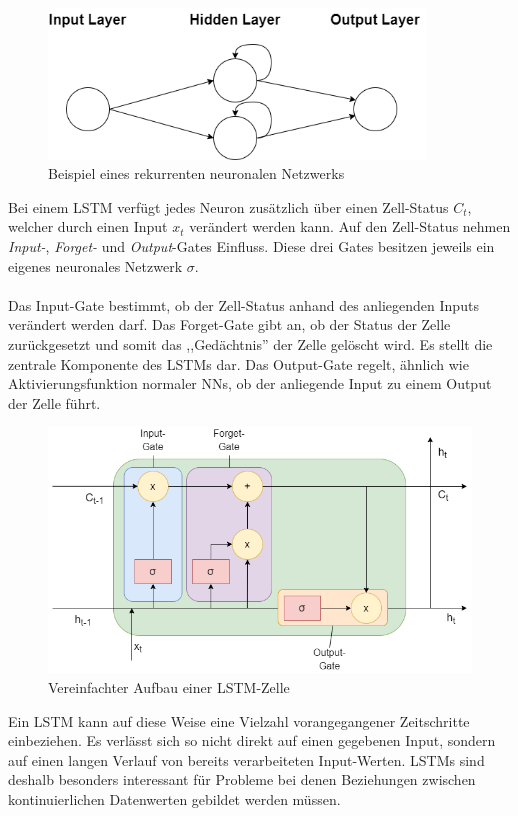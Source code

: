 \begin{figure}[h]
    \centering
    \includegraphics[width=10.0cm]{pic/RecurrentNN.png}
    \caption{Beispiel eines rekurrenten neuronalen Netzwerks}
    \label{fig:RecNN}
\end{figure}
\newpage
Bei einem LSTM verfügt jedes Neuron zusätzlich über einen Zell-Status $C_t$, welcher durch einen Input $x_t$ verändert werden kann.
Auf den Zell-Status nehmen \textit{Input-}, \textit{Forget-} und \textit{Output}-Gates Einfluss. Diese drei Gates
besitzen jeweils ein eigenes neuronales Netzwerk $\sigma$.\\\\
Das Input-Gate bestimmt, ob der Zell-Status anhand des anliegenden Inputs verändert werden darf.
Das Forget-Gate gibt an, ob der Status der Zelle zurückgesetzt und somit das ,,Gedächtnis'' der Zelle gelöscht wird. Es
stellt die zentrale Komponente des LSTMs dar.
Das Output-Gate regelt, ähnlich wie Aktivierungsfunktion normaler NNs, ob der anliegende Input zu einem Output 
der Zelle führt.

\begin{figure}[h]
    \centering
    \includegraphics[width=12.0cm]{pic/LSTM-Cell.png}
    \caption{Vereinfachter Aufbau einer LSTM-Zelle}
    \label{fig:LSTM_Cell}
\end{figure}

Ein LSTM kann auf diese Weise eine Vielzahl vorangegangener Zeitschritte einbeziehen. Es verlässt sich so nicht 
direkt auf einen gegebenen Input, sondern auf einen langen Verlauf von bereits verarbeiteten Input-Werten. 
LSTMs sind deshalb besonders interessant für Probleme bei denen Beziehungen zwischen kontinuierlichen 
Datenwerten gebildet werden müssen.

